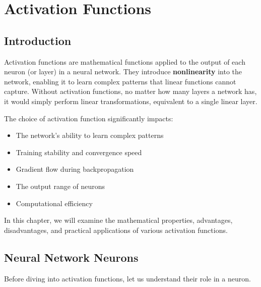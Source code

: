 %
%
%

\clearpage
\cleardoublepage

\chapter{Activation Functions}

\section{Introduction}

Activation functions are mathematical functions applied to the output of each neuron (or layer) in a neural network. They introduce \textbf{nonlinearity} into the network, enabling it to learn complex patterns that linear functions cannot capture. Without activation functions, no matter how many layers a network has, it would simply perform linear transformations, equivalent to a single linear layer.

The choice of activation function significantly impacts:
\begin{itemize}
    \item The network's ability to learn complex patterns
    \item Training stability and convergence speed
    \item Gradient flow during backpropagation
    \item The output range of neurons
    \item Computational efficiency
\end{itemize}

In this chapter, we will examine the mathematical properties, advantages, disadvantages, and practical applications of various activation functions.

\section{Neural Network Neurons}

Before diving into activation functions, let us understand their role in a neuron.

